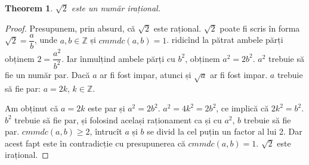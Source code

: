 \documentclass{article}
\newtheorem*{thm}{Theorem}
\begin{document}
\begin{thm}
$\sqrt{2}$ este un număr irațional.
\end{thm}
\begin{proof}
Presupunem, prin absurd, că $\sqrt{2}$ este rațional. \Therefore $\sqrt{2}$ poate fi scris în forma  $\sqrt{2} = \dfrac{a}{b}$, unde $a, b \in \mathbb{Z}$ și $cmmdc(a,b) = 1$. \Therefore ridicînd la pătrat ambele părți obținem $2 = \dfrac{a^2}{b^2}$. Iar înmulțind ambele părți cu $b^2$, obținem $a^2 = 2b^2$. \Therefore $a^2$ trebuie să fie un număr par. Dacă $a$ ar fi fost impar, atunci și $\sqrt{a}$ ar fi fost impar. \Therefore $a$ trebuie să fie par: $a=2k$, $k \in \mathbb{Z}$. 

Am obținut că $a=2k$ este par și $a^2 = 2b^2$. \Therefore $a^2 = 4k^2 = 2b^2$, ce implică că $2k^2 = b^2$. \Therefore $b^2$ trebuie să fie par, și folosind același raționament ca și cu $a^2$, $b$ trebuie să fie par. \Therefore $cmmdc(a,b) \geq 2$, întrucît $a$ și $b$ se divid la cel puțin un factor al lui 2. Dar acest fapt este în contradicție cu presupunerea că $cmmdc(a,b) = 1$. \Therefore $\sqrt{2}$ este irațional.
\end{proof}
\end{document}
